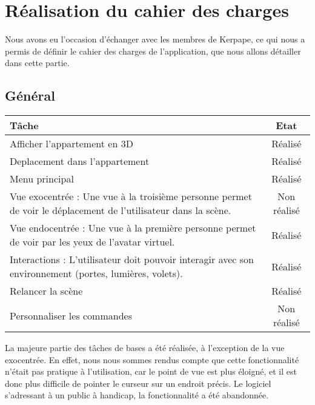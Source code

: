 \section{Réalisation du cahier des charges}
Nous avons eu l'occasion d'échanger avec les membres de Kerpape, ce qui nous a permis de définir le cahier des charges de l'application, que nous allons détailler dans cette partie. \\

\subsection{Général}
\begin{tabular}{|p{13cm}|c|}
	\hline
	Tâche & Etat \\ \hline
	Afficher l'appartement en 3D & Réalisé \\ \hline
	Deplacement dans l'appartement & Réalisé \\ \hline
	Menu principal & Réalisé \\ \hline
	Vue exocentrée : Une vue à la troisième personne permet de voir le déplacement de l'utilisateur dans la scène. & Non réalisé \\ \hline
	Vue endocentrée : Une vue à la première personne permet de voir par les yeux de l'avatar  virtuel. & Réalisé \\ \hline
	Interactions : L'utilisateur doit pouvoir interagir avec son environnement (portes, lumières, volets). & Réalisé \\ \hline
	Relancer la scène & Réalisé \\ \hline
	Personnaliser les commandes & Non réalisé \\ \hline
\end{tabular}
La majeure partie des tâches de bases a été réalisée, à l'exception de la vue exocentrée. 
En effet, nous nous sommes rendus compte que cette fonctionnalité n'était pas pratique à l'utilisation, car le point de vue est plus éloigné, et il est donc plus difficile de pointer le curseur sur un endroit précis.
Le logiciel s'adressant à un public à handicap, la fonctionnalité a été abandonnée.
	
